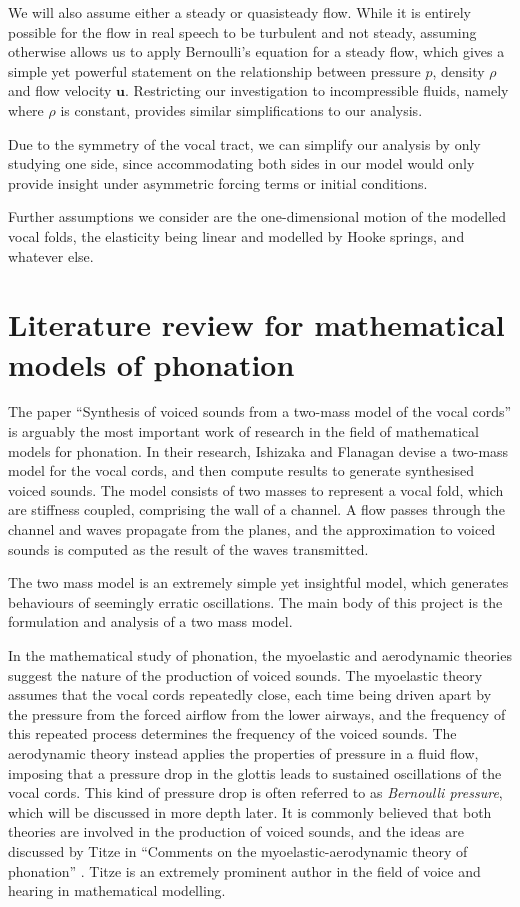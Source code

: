 \documentclass{book}
\begin{document}
We will also assume either a steady or quasisteady flow.
While it is entirely possible for the flow in real speech to be turbulent and not steady,
assuming otherwise allows us to apply Bernoulli's equation for a steady flow,
which gives a simple yet powerful statement on the relationship between pressure $p$, density $\rho$ and flow velocity $\mathbf{u}$.
Restricting our investigation to incompressible fluids, namely where $\rho$ is constant,
provides similar simplifications to our analysis.

Due to the symmetry of the vocal tract,
we can simplify our analysis by only studying one side,
since accommodating both sides in our model would only provide insight under asymmetric forcing terms or initial conditions.

Further assumptions we consider are the one-dimensional motion of the modelled vocal folds,
the elasticity being linear and modelled by Hooke springs,
and {whatever else}. 

\section{Literature review for mathematical models of phonation}

The paper ``Synthesis of voiced sounds from a two-mass model of the vocal cords'' \cite[1972]{ishizaka_flanagan_1972} is arguably the most important work of research in the field of mathematical models for phonation.
In their research, Ishizaka and Flanagan devise a two-mass model for the vocal cords, and then compute results to generate synthesised voiced sounds.
The model consists of two masses to represent a vocal fold, which are stiffness coupled, comprising the wall of a channel.
A flow passes through the channel and waves propagate from the planes,
and the approximation to voiced sounds is computed as the result of the waves transmitted. %

The two mass model is an extremely simple yet insightful model,
which generates behaviours of seemingly erratic oscillations.
The main body of this project is the formulation and analysis of a two mass model.

In the mathematical study of phonation, the myoelastic and aerodynamic theories suggest the nature of the production of voiced sounds.
The myoelastic theory assumes that the vocal cords repeatedly close,
each time being driven apart by the pressure from the forced airflow from the lower airways,
and the frequency of this repeated process determines the frequency of the voiced sounds.
The aerodynamic theory instead applies the properties of pressure in a fluid flow,
imposing that a pressure drop in the glottis leads to sustained oscillations of the vocal cords.
This kind of pressure drop is often referred to as \textit{Bernoulli pressure}, which will be discussed in more depth later.
It is commonly believed that both theories are involved in the production of voiced sounds,
and the ideas are discussed by Titze in ``Comments on the myoelastic-aerodynamic theory of phonation'' \cite[1980]{titze_1980}.
Titze is an extremely prominent author in the field of voice and hearing in mathematical modelling.
\end{document}
